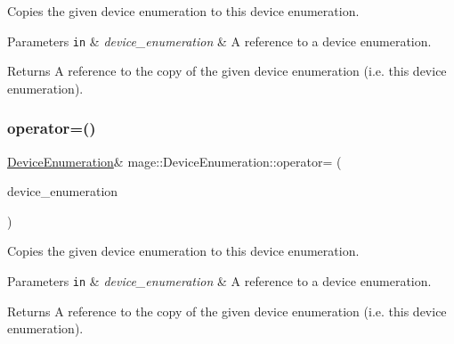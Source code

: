 Copies the given device enumeration to this device enumeration.


\begin{DoxyParams}[1]{Parameters}
\mbox{\tt in}  & {\em device\+\_\+enumeration} & A reference to a device enumeration. \\
\hline
\end{DoxyParams}
\begin{DoxyReturn}{Returns}
A reference to the copy of the given device enumeration (i.\+e. this device enumeration). 
\end{DoxyReturn}
\hypertarget{classmage_1_1_device_enumeration_accf36804bfe510cc8a4d8495854596d6}{}\label{classmage_1_1_device_enumeration_accf36804bfe510cc8a4d8495854596d6} 
\subsubsection{\texorpdfstring{operator=()}{operator=()}\hspace{0.1cm}{\footnotesize\ttfamily [2/2]}}
{\footnotesize\ttfamily \hyperlink{classmage_1_1_device_enumeration}{Device\+Enumeration}\& mage\+::\+Device\+Enumeration\+::operator= (\begin{DoxyParamCaption}\item[{\hyperlink{classmage_1_1_device_enumeration}{Device\+Enumeration} \&\&}]{device\+\_\+enumeration }\end{DoxyParamCaption})\hspace{0.3cm}{\ttfamily [delete]}}

Copies the given device enumeration to this device enumeration.


\begin{DoxyParams}[1]{Parameters}
\mbox{\tt in}  & {\em device\+\_\+enumeration} & A reference to a device enumeration. \\
\hline
\end{DoxyParams}
\begin{DoxyReturn}{Returns}
A reference to the copy of the given device enumeration (i.\+e. this device enumeration). 
\end{DoxyReturn}
\hypertarget{classmage_1_1_device_enumeration_a5950a6575d9073d6d23b228779f5ace1}{}\label{classmage_1_1_device_enumeration_a5950a6575d9073d6d23b228779f5ace1} 
